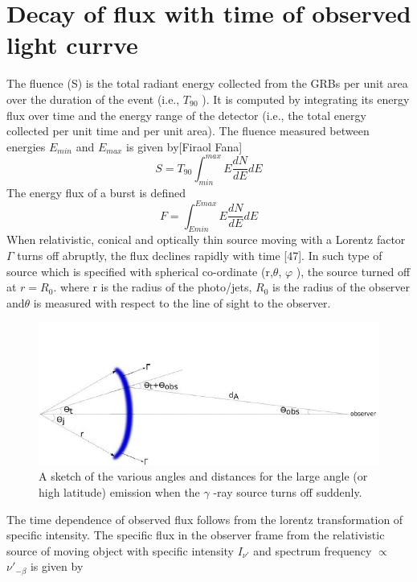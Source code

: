 \section{Decay of flux with time of observed light currve }
The fluence (S) is the total radiant energy collected from the GRBs per unit area over the duration of the event (i.e., $ T_{90} $ ). It is computed by integrating its energy flux over time and the energy range of the detector (i.e., the total energy collected per unit time and per unit area). The fluence measured between energies $ E_{min} $ and $ E_{max} $ is given by[Firaol Fana]
\begin{equation}
S= T_{90}\int_{min}^{max}E\frac{dN}{dE}dE
\end{equation}
The energy flux of a burst is defined
\begin{equation}
F=\int_{Emin}^{Emax}E\frac{dN}{dE}dE
\end{equation}
When relativistic, conical and optically thin source moving with a Lorentz factor     $ \Gamma $ turns off abruptly, the flux declines rapidly with time [47]. In such type of source which is specified with spherical co-ordinate (r,$\theta $, $\varphi $ ), the source turned off at $ r =  R_{0} $. where r is the radius of the photo/jets, $ R_{0} $ is the radius of the observer and$ \theta $ is measured with respect to the line of sight to the observer.
\begin{figure}[h]
\begin{center}
\includegraphics[scale=0.5]{Figures/Flux.png}
\caption{ A sketch of the various angles and distances for the large angle (or high
latitude) emission when the $\gamma$ -ray source turns off suddenly.}
\end{center}
\end{figure}
The time dependence of observed flux follows from the lorentz transformation of
specific intensity. The specific flux in the observer frame from the relativistic source of moving object with specific intensity $ I_{\nu'} $ and spectrum frequency $\propto $ $ \nu'_{-\beta} $ is given by
